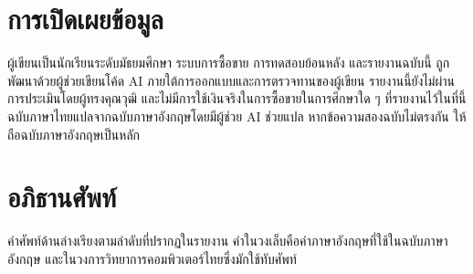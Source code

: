 \documentclass[11pt,a4paper]{article}
\newcommand{\tw}[1]{\texorpdfstring{\hspace{0pt}\mbox{#1}\hspace{0pt}}{#1}}
\begin{document}


\section{การเปิดเผยข้อมูล}
\label{app:disclosure}
ผู้เขียนเป็นนักเรียนระดับมัธยมศึกษา ระบบการ\tw{ซื้อขาย} การทดสอบย้อนหลัง และรายงานฉบับนี้
ถูกพัฒนาด้วยผู้ช่วยเขียนโค้ด AI ภายใต้การออกแบบและการตรวจทานของผู้เขียน
รายงานนี้ยังไม่ผ่านการประเมินโดยผู้ทรงคุณวุฒิ และไม่มีการใช้เงินจริงในการ\tw{ซื้อขาย}ในการศึกษาใด ๆ
ที่รายงานไว้ในที่นี้ ฉบับภาษาไทยแปลจากฉบับ\tw{ภาษาอังกฤษ}โดยมีผู้ช่วย AI ช่วยแปล
หากข้อความสองฉบับไม่ตรงกัน ให้ถือฉบับ\tw{ภาษาอังกฤษ}เป็นหลัก

\section{อภิธานศัพท์}
\label{app:glossary}
คำศัพท์ด้านล่างเรียงตามลำดับที่ปรากฏในรายงาน คำในวงเล็บคือคำ\tw{ภาษาอังกฤษ}ที่ใช้ในฉบับ\tw{ภาษาอังกฤษ}
และในวงการวิทยาการคอมพิวเตอร์ไทยซึ่งมักใช้ทับศัพท์
\end{document}
